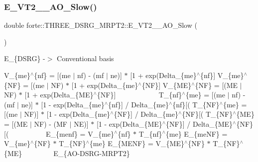 \subsubsection{\texorpdfstring{E\+\_\+\+V\+T2\+\_\+\_\+\+A\+O\+\_\+\+Slow()}{E\_VT2\_2\_AO\_Slow()}}
{\footnotesize\ttfamily double forte\+::\+T\+H\+R\+E\+E\+\_\+\+D\+S\+R\+G\+\_\+\+M\+R\+P\+T2\+::\+E\+\_\+\+V\+T2\+\_\+\_\+\+A\+O\+\_\+\+Slow (\begin{DoxyParamCaption}{ }\end{DoxyParamCaption})\hspace{0.3cm}{\ttfamily [protected]}}

E\+\_\+\{D\+S\+RG\} -\/$>$ Conventional basis

V\+\_\+\{me\}$^\wedge$\{nf\} = \mbox{[}(me $\vert$ nf) -\/ (mf $\vert$ ne)\mbox{]} $\ast$ \mbox{[}1 + exp(Delta\+\_\+\{me\}$^\wedge$\{nf\}\mbox{]} V\+\_\+\{me\}$^\wedge$\{NF\} = \mbox{[}(me $\vert$ NF) $\ast$ \mbox{[}1 + exp(Delta\+\_\+\{me\}$^\wedge$\{NF\}\mbox{]} V\+\_\+\{ME\}$^\wedge$\{NF\} = \mbox{[}(ME $\vert$ NF) $\ast$ \mbox{[}1 + exp(Delta\+\_\+\{ME\}$^\wedge$\{NF\}\mbox{]} ~\newline
~\newline
~\newline
~\newline
~\newline
~\newline
~\newline
 T\+\_\+\{nf\}$^\wedge$\{me\} = \mbox{[}(me $\vert$ nf) -\/ (mf $\vert$ ne)\mbox{]} $\ast$ \mbox{[}1 -\/ exp(Delta\+\_\+\{me\}$^\wedge$\{nf\}\mbox{]} / Delta\+\_\+\{me\}$^\wedge$\{nf\}\mbox{[}( T\+\_\+\{NF\}$^\wedge$\{me\} = \mbox{[}(me $\vert$ NF)\mbox{]} $\ast$ \mbox{[}1 -\/ exp(Delta\+\_\+\{me\}$^\wedge$\{NF\}\mbox{]} / Delta\+\_\+\{me\}$^\wedge$\{NF\}\mbox{[}( T\+\_\+\{NF\}$^\wedge$\{ME\} = \mbox{[}(ME $\vert$ NF) -\/ (MF $\vert$ NE)\mbox{]} $\ast$ \mbox{[}1 -\/ exp(Delta\+\_\+\{ME\}$^\wedge$\{NF\}\mbox{]} / Delta\+\_\+\{ME\}$^\wedge$\{NF\}\mbox{[}( ~\newline
~\newline
~\newline
~\newline
~\newline
~\newline
 E\+\_\+\{menf\} = V\+\_\+\{me\}$^\wedge$\{nf\} $\ast$ T\+\_\+\{nf\}$^\wedge$\{me\} E\+\_\+\{me\+NF\} = V\+\_\+\{me\}$^\wedge$\{NF\} $\ast$ T\+\_\+\{NF\}$^\wedge$\{me\} E\+\_\+\{M\+E\+NF\} = V\+\_\+\{ME\}$^\wedge$\{NF\} $\ast$ T\+\_\+\{NF\}$^\wedge$\{ME\} ~\newline
~\newline
~\newline
~\newline
~\newline
 E\+\_\+\{A\+O-\/\+D\+S\+R\+G-\/\+M\+R\+P\+T2\}

